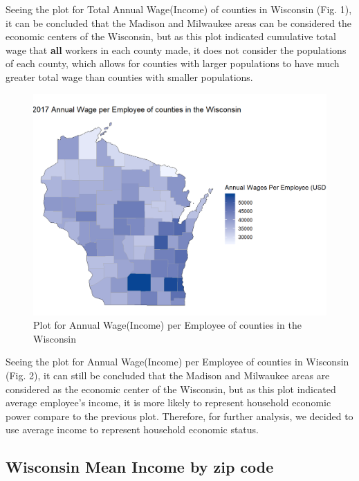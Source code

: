 \documentclass[letterpaper, 10 pt, conference]{ieeeconf}  %
\begin{document}
Seeing the plot for Total Annual Wage(Income) of counties in Wisconsin (Fig. 1), it can be concluded that the Madison and Milwaukee areas can be considered the economic centers of the Wisconsin, but as this plot indicated cumulative total wage that \textbf{all} workers in each county made, it does not consider the populations of each county, which allows for counties with larger populations to have much greater total wage than counties with smaller populations.

\begin{figure}[h]
\begin{center}
\includegraphics[width=1.0\linewidth]{2017_Annual_Wage_per_Employee.png}
\end{center}
\caption{Plot for Annual Wage(Income) per Employee of counties in the Wisconsin}
\label{fig:long}
\label{fig:onecol}
\end{figure}

Seeing the plot for Annual Wage(Income) per Employee of counties in Wisconsin (Fig. 2), it can still be concluded that the Madison and Milwaukee areas are considered as the economic center of the Wisconsin, but as this plot indicated average employee's income, it is more likely to represent household economic power compare to the previous plot.
Therefore, for further analysis, we decided to use average income to represent household economic status.

\subsection{Wisconsin Mean Income by zip code}
\end{document}
